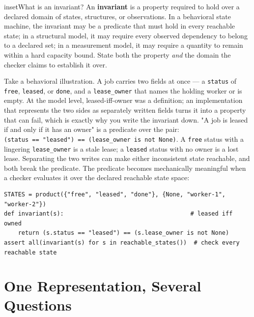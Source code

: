 




\begin{bookbox}{inset}{What is an invariant?}
\label{inset-invariant}
An \textbf{invariant} is a property required to hold over a declared domain of states, structures, or observations. In a behavioral state machine, the invariant may be a predicate that must hold in every reachable state; in a structural model, it may require every observed dependency to belong to a declared set; in a measurement model, it may require a quantity to remain within a hard capacity bound. State both the property \emph{and} the domain the checker claims to establish it over.

Take a behavioral illustration. A job carries two fields at once --- a \texttt{status} of \texttt{free}, \texttt{leased}, or \texttt{done}, and a \texttt{lease\_owner} that names the holding worker or is empty. At the model level, leased-iff-owner was a definition; an implementation that represents the two sides as separately written fields turns it into a property that can fail, which is exactly why you write the invariant down. "A job is leased if and only if it has an owner" is a predicate over the pair: \texttt{(status~==~"leased")~==~(lease\_owner~is~not~None)}. A \texttt{free} status with a lingering \texttt{lease\_owner} is a stale lease; a \texttt{leased} status with no owner is a lost lease. Separating the two writes can make either inconsistent state reachable, and both break the predicate. The predicate becomes mechanically meaningful when a checker evaluates it over the declared reachable state space:

\begin{verbatim}
STATES = product({"free", "leased", "done"}, {None, "worker-1", "worker-2"})
def invariant(s):                                    # leased iff owned
    return (s.status == "leased") == (s.lease_owner is not None)
assert all(invariant(s) for s in reachable_states())  # check every reachable state
\end{verbatim}
\end{bookbox}

\section{One Representation, Several Questions}\label{heading:one-representation-several-questions}

